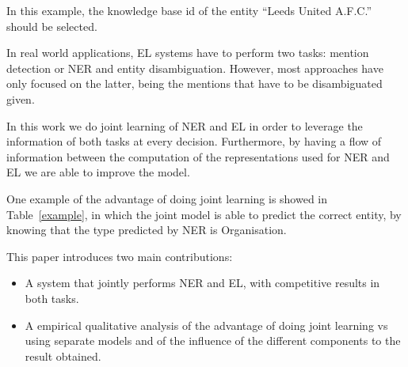 \documentclass[11pt,a4paper,dvipsnames]{article}
\begin{document}
In this example, the knowledge base id of the entity ``Leeds United A.F.C.'' should be selected.

In real world applications, EL systems have to perform two tasks: mention detection or NER and entity disambiguation. However, most approaches have only focused on the latter, being the mentions that have to be disambiguated given.

In this work we do joint learning of NER and EL in order to leverage the information of both tasks at every decision. Furthermore, by having a flow of information between the computation of the representations used for NER and EL we are able to improve the model. 

One example of the advantage of doing joint learning is showed in Table~\ref{example}, in which the joint model is able to predict the correct entity, by knowing that the type predicted by NER is Organisation.

This paper introduces two main contributions:
\begin{itemize}
    \item A system that jointly performs NER and EL, with competitive results in both tasks.
    \item A empirical qualitative analysis of the advantage of doing joint learning vs using separate models and of the influence of the different components to the result obtained.
\end{itemize}

\renewcommand{\arraystretch}{1.27}{
\begin{table*}[ht]
\begin{centering}\small
{}
\par\end{centering}
\centering{}\caption{Actions and stack states when processing sentence ``Obama met Donald Trump''. The predicted types and detected mentions are contained in the Output and the entities the mentions refer to in the Entity.}
\label{example_stack}
\end{table*}
}
\end{document}
